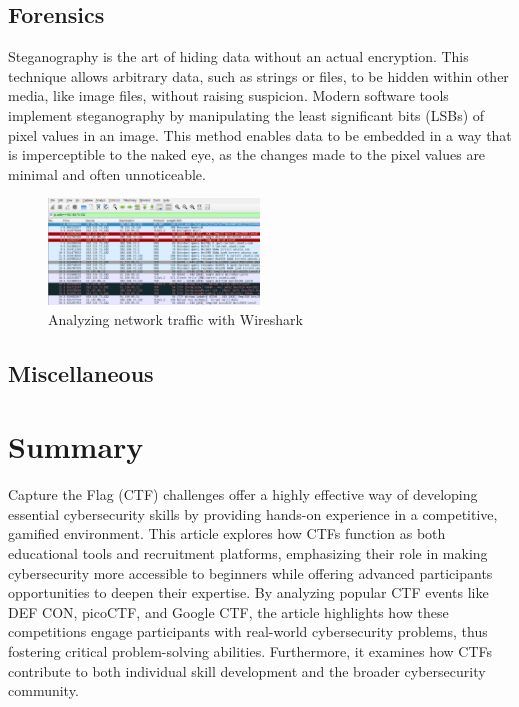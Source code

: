 \documentclass[conference]{IEEEtran}
\begin{document}
\cite{lhee2003}

\cite{stallman1988}

\subsection{Forensics}

Steganography is the art of hiding data without an actual encryption.
This technique allows arbitrary data, such as strings or files, to be hidden
within other media, like image files, without raising suspicion.
Modern software tools implement steganography by manipulating the least
significant bits (LSBs) of pixel values in an image. This method enables data
to be embedded in a way that is imperceptible to the naked eye, as the changes
made to the pixel values are minimal and often unnoticeable.



\begin{figure}[htbp]
	\centering
	\includegraphics[width=0.5\textwidth]{fig/wireshark.png}
	\caption{Analyzing network traffic with Wireshark}
	\label{fig-wireshark}
\end{figure}


\cite{ndatinya2015}


\subsection{Miscellaneous}

\cite{butun2019}

\cite{ziade2004}


\section{Summary}

Capture the Flag (CTF) challenges offer a highly effective way of developing
essential cybersecurity skills by providing hands-on experience in a
competitive, gamified environment. This article explores how CTFs function as
both educational tools and recruitment platforms, emphasizing their role in
making cybersecurity more accessible to beginners while offering advanced
participants opportunities to deepen their expertise. By analyzing popular CTF
events like DEF CON, picoCTF, and Google CTF, the article highlights how these
competitions engage participants with real-world cybersecurity problems, thus
fostering critical problem-solving abilities. Furthermore, it examines how CTFs
contribute to both individual skill development and the broader cybersecurity
community.



\end{document}
